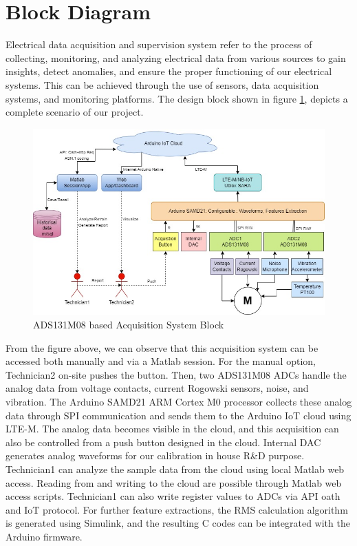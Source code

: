 \section{Block Diagram} 
Electrical data acquisition and supervision system refer to the process of collecting, monitoring, and analyzing electrical data from various sources to gain insights, detect anomalies, and ensure the proper functioning of our electrical systems. This can be achieved through the use of sensors, data acquisition systems, and monitoring platforms. The design block shown in figure \ref{fig:x System Block}, depicts a complete scenario of our project. 

\begin{figure}[htbp]
\centering
\includegraphics[scale=0.5]{images/Acqsys.jpg}
\caption{ADS131M08 based Acquisition System Block}
\label{fig:x System Block}
\end{figure}

From the figure above, we can observe that this acquisition system can be accessed both manually and via a Matlab session. For the manual option, Technician2 on-site pushes the button. Then, two ADS131M08 ADCs handle the analog data from voltage contacts, current Rogowski sensors, noise, and vibration. The Arduino SAMD21 ARM Cortex M0 processor collects these analog data through SPI communication and sends them to the Arduino IoT cloud using LTE-M. The analog data becomes visible in the cloud, and this acquisition can also be controlled from a push button designed in the cloud. Internal DAC generates analog waveforms for our calibration in house R\&D purpose.
Technician1 can analyze the sample data from the cloud using local Matlab web access. Reading from and writing to the cloud are possible through Matlab web access scripts. Technician1 can also write register values to ADCs via API oath and IoT protocol. For further feature extractions, the RMS calculation algorithm is generated using Simulink, and the resulting C codes can be integrated with the Arduino firmware. 

